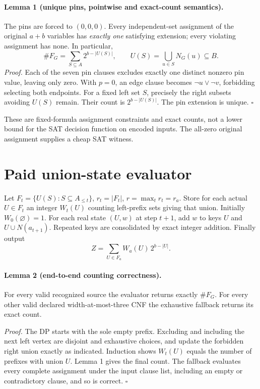 \documentclass[11pt]{article}
\begin{document}
\paragraph{Lemma 1 (unique pins, pointwise and exact-count semantics).}
The pins are forced to $(0,0,0)$. Every independent-set assignment of the original $a+b$ variables has \emph{exactly one} satisfying extension; every violating assignment has none. In particular,
\[
\#F_G=\sum_{S\subseteq A}2^{b-|U(S)|},\qquad
U(S)=\bigcup_{u\in S}N_G(u)\subseteq B.
\]
\emph{Proof.} Each of the seven pin clauses excludes exactly one distinct nonzero pin value, leaving only zero. With $p=0$, an edge clause becomes $\neg u\lor\neg v$, forbidding selecting both endpoints. For a fixed left set $S$, precisely the right subsets avoiding $U(S)$ remain. Their count is $2^{b-|U(S)|}$. The pin extension is unique. \hfill$\square$

These are fixed-formula assignment constraints and exact counts, not a lower bound for the SAT decision function on encoded inputs. The all-zero original assignment supplies a cheap SAT witness.

\section{Paid union-state evaluator}
Let $F_t=\{U(S):S\subseteq A_{\le t}\}$, $r_t=|F_t|$, $r=\max_t r_t=r_a$. Store for each actual $U\in F_t$ an integer $W_t(U)$ counting left-prefix sets giving that union. Initially $W_0(\varnothing)=1$. For each real state $(U,w)$ at step $t+1$, add $w$ to keys $U$ and $U\cup N(a_{t+1})$. Repeated keys are consolidated by exact integer addition. Finally output
\[
Z=\sum_{U\in F_a} W_a(U)\,2^{b-|U|}.
\]

\paragraph{Lemma 2 (end-to-end counting correctness).}
For every valid recognized source the evaluator returns exactly $\#F_G$. For every other valid declared width-at-most-three CNF the exhaustive fallback returns its exact count.

\emph{Proof.} The DP starts with the sole empty prefix. Excluding and including the next left vertex are disjoint and exhaustive choices, and update the forbidden right union exactly as indicated. Induction shows $W_t(U)$ equals the number of prefixes with union $U$. Lemma 1 gives the final count. The fallback evaluates every complete assignment under the input clause list, including an empty or contradictory clause, and so is correct. \hfill$\square$
\end{document}
